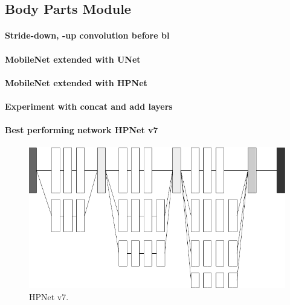 \subsection{Body Parts Module }
\label{RBP}


\paragraph{Stride-down, -up convolution before \gls{bl}}

\paragraph{MobileNet extended with UNet}
\paragraph{MobileNet extended with HPNet}

\paragraph{Experiment with concat and add layers}

\paragraph{Best performing network HPNet v7}

\begin{figure}[H]
    \centering
    \includegraphics[width=\textwidth,height=\textheight,keepaspectratio]{img/network_v7_hrnet.png}
    \decoRule
    \caption[HPNet v7]{HPNet v7.}
    \label{fig:hrnet-v7}
\end{figure}


